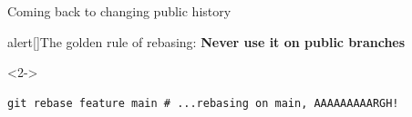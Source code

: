 \documentclass[usenames,svgnames,14pt]{beamer}
\begin{document}
\begin{frame}[fragile]{Coming back to changing public history}
    \begin{overlayarea}{\textwidth}{0.7\textheight}
        \begin{varblock}{alert}[\textwidth]{The golden rule of rebasing: \textbf{Never use it on public branches}}
            \usebox{\savedTikZ}
            \vspace{5mm}
            \begin{uncoverenv}<2->
                \begin{lstlisting}[style=MyBash]
                    git rebase feature main # ...rebasing on main, AAAAAAAAARGH!
                \end{lstlisting}
            \end{uncoverenv}
        \end{varblock}
    \end{overlayarea}
\end{frame}


\end{document}
